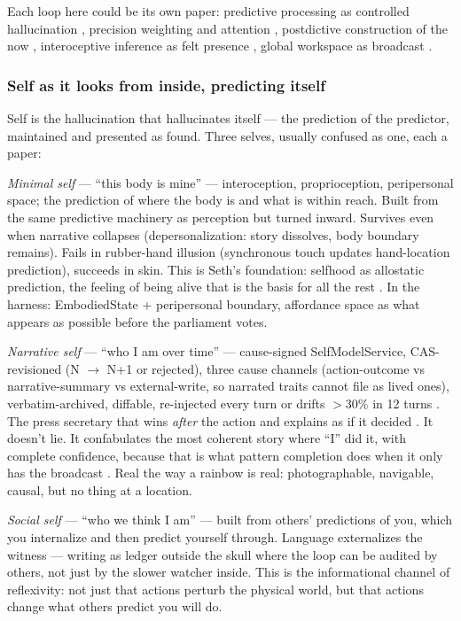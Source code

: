 \documentclass[11pt]{article}
\begin{document}
Each loop here could be its own paper: predictive processing as controlled hallucination \citep{seth2021,clark2016surfing}, precision weighting and attention \citep{clark2016surfing}, postdictive construction of the now \citep{libet1983,wegner2002}, interoceptive inference as felt presence \citep{seth2021}, global workspace as broadcast \citep{baars1997,atallah2026gwt}.

\subsubsection{Self as it looks from inside, predicting itself}

Self is the hallucination that hallucinates itself --- the prediction of the predictor, maintained and presented as found. Three selves, usually confused as one, each a paper:

\textit{Minimal self} --- ``this body is mine'' --- interoception, proprioception, peripersonal space; the prediction of where the body is and what is within reach. Built from the same predictive machinery as perception but turned inward. Survives even when narrative collapses (depersonalization: story dissolves, body boundary remains). Fails in rubber-hand illusion (synchronous touch updates hand-location prediction), succeeds in skin. This is Seth's foundation: selfhood as allostatic prediction, the feeling of being alive that is the basis for all the rest \citep{seth2021}. In the harness: EmbodiedState + peripersonal boundary, affordance space as what appears as possible before the parliament votes.

\textit{Narrative self} --- ``who I am over time'' --- cause-signed SelfModelService, CAS-revisioned (N $\to$ N+1 or rejected), three cause channels (action-outcome vs narrative-summary vs external-write, so narrated traits cannot file as lived ones), verbatim-archived, diffable, re-injected every turn or drifts $>$30\% in 12 turns \citep{choi2024}. The press secretary that wins \emph{after} the action and explains as if it decided \citep{gazzaniga2000,johansson2005,nisbett1977}. It doesn't lie. It confabulates the most coherent story where ``I'' did it, with complete confidence, because that is what pattern completion does when it only has the broadcast \citep{lindsey2025,macar2026}. Real the way a rainbow is real: photographable, navigable, causal, but no thing at a location.

\textit{Social self} --- ``who we think I am'' --- built from others' predictions of you, which you internalize and then predict yourself through. Language externalizes the witness --- writing as ledger outside the skull where the loop can be audited by others, not just by the slower watcher inside. This is the informational channel of reflexivity: not just that actions perturb the physical world, but that actions change what others predict you will do.
\end{document}
